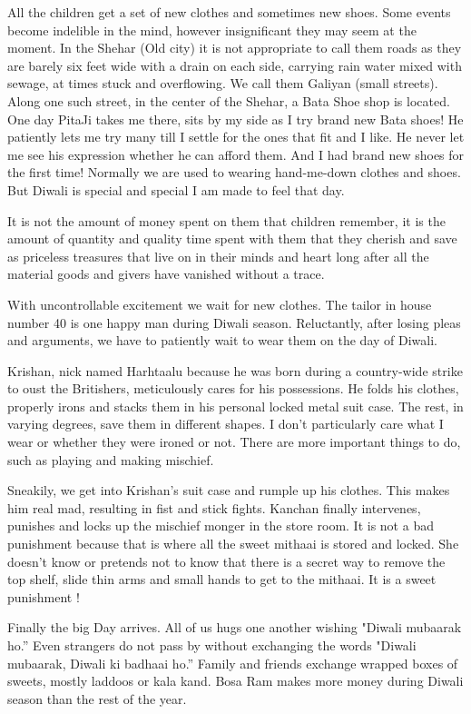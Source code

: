 All the children get a set of new clothes and sometimes new shoes. Some
events become indelible in the mind, however insignificant they may seem
at the moment. In the Shehar (Old city) it is not appropriate to call them
roads as they are barely six feet wide with a drain on each side, carrying
rain water mixed with sewage, at times stuck and overflowing. We call them
Galiyan (small streets). Along one such street, in the center of the
Shehar, a Bata Shoe shop is located. One day PitaJi takes me there, sits
by my side as I try brand new Bata shoes!  He patiently lets me try many
till I settle for the ones that fit and I like. He never let me see his
expression whether he can afford them. And I had brand new shoes for the
first time! Normally we are used to wearing hand-me-down clothes and
shoes. But Diwali is special and special I am made to feel that day. 

It is not the amount of money spent on them that children remember, it is
the amount of quantity and quality time spent with them that they cherish
and save as priceless treasures that live on in their minds and heart long
after all the material goods and givers have vanished without a trace. 

With uncontrollable excitement we wait for new clothes. The tailor in
house number 40 is one happy man during Diwali season. Reluctantly, after
losing pleas and arguments, we have to patiently wait to wear them on the
day of Diwali. 

Krishan, nick named Harhtaalu because he was born during a country-wide
strike to oust the Britishers, meticulously cares for his possessions. He
folds his clothes, properly irons and stacks them in his personal locked
metal suit case.  The rest, in varying degrees, save them in different
shapes. I don’t particularly care what I wear or whether they were ironed
or not. There are more important things to do, such as playing and making
mischief. 

Sneakily, we get into Krishan's suit case and rumple up his clothes. This
makes him real mad, resulting in fist and stick fights. Kanchan finally
intervenes, punishes and locks up the mischief monger in the store room.
It is not a bad punishment because that is where all the sweet mithaai is
stored and locked. She doesn’t know or pretends not to know that there is
a secret way to remove the top shelf, slide thin arms and small hands to
get to the mithaai. It is a sweet punishment !

Finally the big Day arrives. All of us hugs one another wishing "Diwali
mubaarak ho.” Even strangers do not pass by without exchanging the words
"Diwali mubaarak, Diwali ki badhaai ho.” Family and friends exchange
wrapped boxes of sweets, mostly laddoos or kala kand. Bosa Ram makes more
money during Diwali season than the rest of the year. 

